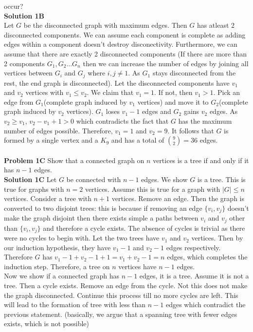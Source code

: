 \documentclass{book}
\begin{document}
occur?\\
\textbf{Solution 1B}\\
Let $G$ be the disconnected graph with maximum edges. Then $G$ has atleast 2 disconnected components. We can assume each component is complete as adding edges within a component doesn't destroy disconectivity. Furthermore, we can assume that there are exactly 2 disconnected components (If there are more than 2 components $G_1,G_2\hdots G_n$ then we can increase the number of edges by joining all vertices between $G_i$ and $G_j$ where $i,j\ne 1$. As $G_1$ stays disconnected from the rest, the end graph is disconnected). Let the disconnected components have $v_1$ and $v_2$ vertices with $v_1\leq v_2$. We claim that $v_1=1$. If not, then  $v_1>1$. Pick an edge from $G_1$(complete graph induced by $v_1$ vertices) and move it to $G_2$(complete graph induced by $v_2$ vertices). $G_1$ loses $v_1-1$ edges and $G_2$ gains $v_2$ edges. As $v_2\geq v_1$, $v_2-v_1+1>0$ which contradicts the fact that $G$ has the maximum number of edges possible. Therefore, $v_1=1$ and $v_2=9$. It follows that $G$ is formed by a single vertex and a $K_9$ and has a total of ${9\choose 2}=36$ edges.     \\\\
\textbf{Problem 1C} Show that a connected graph on $n$ vertices is a tree
if and only if it has $n - 1$ edges.\\
\textbf{Solution 1C}
Let $G$ be connected with $n-1$ edges. We  show $G$ is a tree. This is true for graphs with $n=2$ vertices. Assume this is true for a graph with $|G|\leq n$ vertices. Consider a tree with $n+1$ vertices. Remove an edge. Then the graph is converted to two disjoint trees: this is because if removing an edge $\{v_i,v_j\}$
doesn't make the graph disjoint then there exists simple a paths between $v_i$ and $v_j$ other than $\{v_i,v_j\}$ and therefore a cycle exists. The absence of cycles is trivial as there were no cycles to begin with. Let the two trees have $v_1$ and $v_2$ vertices. Then by our induction hypothesis, they have $v_1-1$ and $v_2-1$ edges respectively. Therefore $G$ has $v_1-1+v_2-1+1=v_1+v_2-1=n$ edges, which completes the induction step. Therefore, a tree on $n$ vertices have $n-1$ edges.\\
Now we show if a connected graph has $n-1$ edges, it is a tree. Assume it is not a tree. Then a cycle exists. Remove an edge from the cycle. Not this does not make the graph disconnected. Continue this process till no more cycles are left. This will lead to the formation of tree with less than $n-1$ edges which contradict the previous statement. (basically, we argue that a spanning tree with fewer edges exists, which is not possible)\\\\
\end{document}
